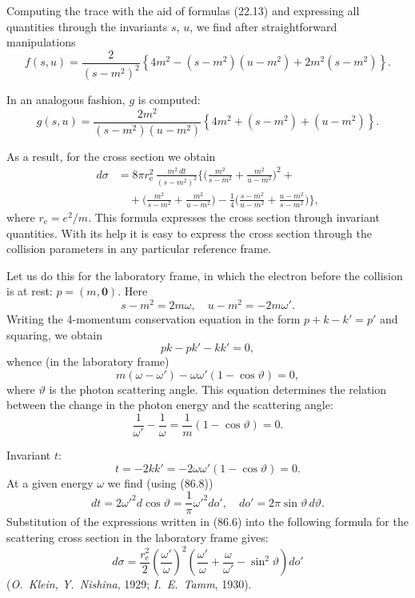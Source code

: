 Computing the trace with the aid of formulas (22.13) and expressing all quantities through the invariants $s$, $u$, we find after straightforward manipulations
\[
f(s,u) = \frac{2}{(s-m^2)^2}\left\{4m^2 - (s-m^2)(u-m^2) + 2m^2(s-m^2)\right\}.
\]


In an analogous fashion, $g$ is computed:
\[
g(s,u) = \frac{2m^2}{(s-m^2)(u-m^2)}\left\{4m^2 + (s-m^2) + (u-m^2)\right\}.
\]

As a result, for the cross section we obtain
\begin{equation}
\begin{split}
d\sigma &= 8\pi r_\mathrm{e}^2\,\frac{m^2\,dt}{(s-m^2)^2}\biggl\{\biggl(\frac{m^2}{s-m^2} + \frac{m^2}{u-m^2}\biggr)^{\!2} + {} \\
&\quad {} + \biggl(\frac{m^2}{s-m^2} + \frac{m^2}{u-m^2}\biggr) - \frac{1}{4}\biggl(\frac{s-m^2}{u-m^2} + \frac{u-m^2}{s-m^2}\biggr)\biggr\},
\end{split}
\label{eq:86.6}
\end{equation}
where $r_\mathrm{e} = e^2/m$. This formula expresses the cross section through invariant quantities. With its help it is easy to express the cross section through the collision parameters in any particular reference frame.

Let us do this for the laboratory frame, in which the electron before the collision is at rest: $p = (m, \mathbf{0})$. Here
\begin{equation}
s - m^2 = 2m\omega, \quad u - m^2 = -2m\omega'.
\label{eq:86.7}
\end{equation}
Writing the 4-momentum conservation equation in the form $p + k - k' = p'$ and squaring, we obtain
\[
pk - pk' - kk' = 0,
\]
whence (in the laboratory frame)
\[
m(\omega - \omega') - \omega\omega'(1 - \cos\vartheta) = 0,
\]
where $\vartheta$ is the photon scattering angle. This equation determines the relation between the change in the photon energy and the scattering angle:
\begin{equation}
\frac{1}{\omega'} - \frac{1}{\omega} = \frac{1}{m}(1 - \cos\vartheta) = 0.
\label{eq:86.8}
\end{equation}

Invariant $t$:
\[
t = -2kk' = -2\omega\omega'(1-\cos\vartheta) = 0.
\]
At a given energy $\omega$ we find (using (86.8))
\[
dt = 2\omega'^2 d\cos\vartheta = \frac{1}{\pi}\omega'^2 do', \quad do' = 2\pi\sin\vartheta\,d\vartheta.
\]
Substitution of the expressions written in (86.6) into the following formula for the scattering cross section in the laboratory frame gives:
\begin{equation}
d\sigma = \frac{r_\mathrm{e}^2}{2}\left(\frac{\omega'}{\omega}\right)^{\!2}\left(\frac{\omega'}{\omega} + \frac{\omega}{\omega'} - \sin^2\vartheta\right)do'
\label{eq:86.9}
\end{equation}
(\emph{O.~Klein, Y.~Nishina}, 1929; \emph{I.~E.~Tamm}, 1930).

